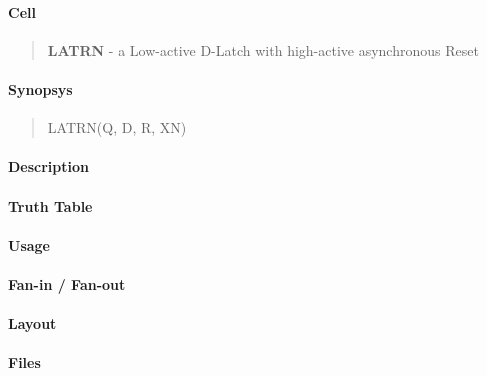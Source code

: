 \label{LATRN}
\paragraph{Cell}
\begin{quote}
    \textbf{LATRN} - a Low-active D-Latch with high-active asynchronous Reset
\end{quote}

\paragraph{Synopsys}
\begin{quote}
    LATRN(Q, D, R, XN)
\end{quote}

\paragraph{Description}

%

\paragraph{Truth Table}
%

\paragraph{Usage}

\paragraph{Fan-in / Fan-out}

\paragraph{Layout}

\paragraph{Files}
